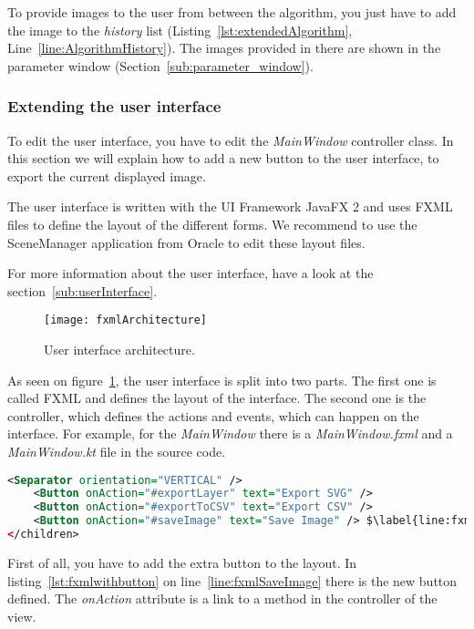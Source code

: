 To provide images to the user from between the algorithm, you just have to add the image to the \textit{history} list (Listing~\ref{lst:extendedAlgorithm}, Line~\ref{line:AlgorithmHistory}). The images provided in there are shown in the parameter window (Section~\ref{sub:parameter_window}).

\subsubsection{Extending the user interface}

To edit the user interface, you have to edit the \textit{MainWindow} controller class. In this section we will explain how to add a new button to the user interface, to export the current displayed image.

The user interface is written with the UI Framework JavaFX 2 and uses FXML files to define the layout of the different forms. We recommend to use the SceneManager application from Oracle to edit these layout files.

For more information about the user interface, have a look at the section~\ref{sub:userInterface}.

\begin{figure}[H]
	\centering
	\texttt{[image: fxmlArchitecture]}
	\caption{User interface architecture.}
	\label{fig:fxmlArchitecture}
\end{figure}

As seen on figure~\ref{fig:fxmlArchitecture}, the user interface is split into two parts. The first one is called FXML and defines the layout of the interface. The second one is the controller, which defines the actions and events, which can happen on the interface. For example, for the \textit{MainWindow} there is a \textit{MainWindow.fxml} and a \textit{MainWindow.kt} file in the source code.

\begin{lstlisting}[caption={MainWindow.fxml with new button.}, label={lst:fxmlwithbutton}, language=XML, escapechar=$]
    <Separator orientation="VERTICAL" />
    <Button onAction="#exportLayer" text="Export SVG" />
    <Button onAction="#exportToCSV" text="Export CSV" />
    <Button onAction="#saveImage" text="Save Image" /> $\label{line:fxmlSaveImage}$
</children>
\end{lstlisting}

First of all, you have to add the extra button to the layout. In listing~\ref{lst:fxmlwithbutton} on line~\ref{line:fxmlSaveImage} there is the new button defined. The \textit{onAction} attribute is a link to a method in the controller of the view.

